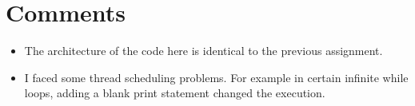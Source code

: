 \documentclass[14pt,titlepage, a4paper]{extarticle}
\begin{document}
\pagebreak
\section{Comments}
\begin{itemize}
		\item The architecture of the code here is identical 
			to the previous assignment. 
		\item I faced some thread scheduling problems.
			For example in certain infinite while loops, adding a blank print statement
			changed the execution.
\end{itemize}
\end{document}
